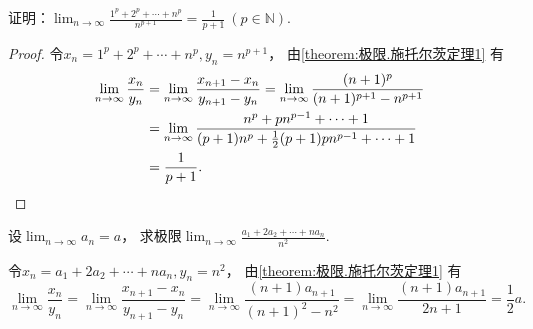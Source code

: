 \begin{example}\label{example:极限.解极限常用公式方法.例1}
证明：\(\lim_{n\to\infty} \frac{1^p+2^p+\dotsb+n^p}{n^{p+1}}
= \frac{1}{p+1}\ (p\in\mathbb{N})\).
\begin{proof}
令\(x_n=1^p+2^p+\dotsb+n^p,
y_n=n^{p+1}\)，
由\cref{theorem:极限.施托尔茨定理1} 有\begin{align*}
	\lim_{n\to\infty} \frac{x_n}{y_n}
	&= \lim_{n\to\infty} \frac{x_{n+1}-x_n}{y_{n+1}-y_n}
	= \lim_{n\to\infty} \frac{(n+1)^p}{(n+1)^{p+1} - n^{p+1}} \\
	&= \lim_{n\to\infty} \frac{n^p + p n^{p-1} + \dotsb + 1}
		{(p+1) n^p + \frac{1}{2} (p+1) p n^{p-1} + \dotsb + 1} \\
	&= \frac{1}{p+1}.
	\qedhere
\end{align*}
\end{proof}
\end{example}

\begin{example}
设\(\lim_{n\to\infty} a_n = a\)，
求极限\(\lim_{n\to\infty} \frac{a_1+2a_2+\dotsb+na_n}{n^2}\).
\begin{solution}
令\(x_n=a_1+2a_2+\dotsb+na_n,
y_n=n^2\)，
由\cref{theorem:极限.施托尔茨定理1} 有\[
	\lim_{n\to\infty} \frac{x_n}{y_n}
	= \lim_{n\to\infty} \frac{x_{n+1}-x_n}{y_{n+1}-y_n}
	= \lim_{n\to\infty} \frac{(n+1)a_{n+1}}{(n+1)^2-n^2}
	= \lim_{n\to\infty} \frac{(n+1)a_{n+1}}{2n+1}
	= \frac12 a.
\]
\end{solution}
\end{example}

